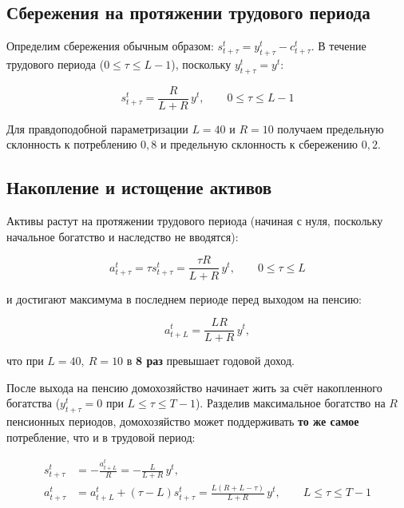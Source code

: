 \documentclass[10pt,a4paper]{article}
\begin{document}
\subsection{Сбережения на протяжении трудового периода}

Определим сбережения обычным образом: $s_{t+\tau}^{t} = y_{t+\tau}^{t} - c_{t+\tau}^{t}$. В течение трудового периода ($0\le\tau\le L-1$), поскольку $y_{t+\tau}^{t}=y^{t}$:
\begin{formulabox}
\begin{equation}
s_{t+\tau}^{t} = \frac{R}{L+R}\,y^{t}, \qquad 0 \le \tau \le L-1 \tag{6.5}
\end{equation}
\end{formulabox}

Для правдоподобной параметризации $L=40$ и $R=10$ получаем предельную склонность к потреблению $0{,}8$ и предельную склонность к сбережению $0{,}2$.

\subsection{Накопление и истощение активов}

Активы растут на протяжении трудового периода (начиная с нуля, поскольку начальное богатство и наследство не вводятся):
\begin{formulabox}
\begin{equation}
a_{t+\tau}^{t} = \tau s_{t+\tau}^{t} = \frac{\tau R}{L+R}\,y^{t}, \qquad 0 \le \tau \le L \tag{6.6}
\end{equation}
\end{formulabox}

и достигают максимума в последнем периоде перед выходом на пенсию:
\begin{formulabox}
\begin{equation}
a_{t+L}^{t} = \frac{LR}{L+R}\,y^{t}, \tag{6.7}
\end{equation}
\end{formulabox}
что при $L=40,\ R=10$ в \textbf{8 раз} превышает годовой доход.

После выхода на пенсию домохозяйство начинает жить за счёт накопленного богатства ($y_{t+\tau}^{t}=0$ при $L\le\tau\le T-1$). Разделив максимальное богатство на $R$ пенсионных периодов, домохозяйство может поддерживать \textbf{то же самое} потребление, что и в трудовой период:
\begin{formulabox}
\begin{align}
s_{t+\tau}^{t} &= -\frac{a_{t+L}^{t}}{R} = -\frac{L}{L+R}\,y^{t}, \tag{6.8}\\
a_{t+\tau}^{t} &= a_{t+L}^{t} + (\tau-L)s_{t+\tau}^{t} = \frac{L(R+L-\tau)}{L+R}\,y^{t}, \qquad L\le\tau\le T-1 \tag{6.9}
\end{align}
\end{formulabox}
\end{document}
